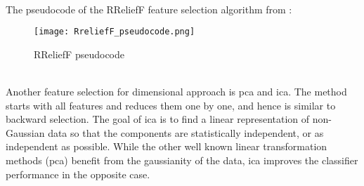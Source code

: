 \\
The pseudocode of the RReliefF feature selection algorithm from \cite{robnik2003theoretical}:
\begin{figure}[h]
    \centering
    \texttt{[image: RreliefF\_pseudocode.png]} 
	\caption{RReliefF pseudocode}
    \label{fig:RreliefF_pseudocode}
\end{figure}
\\ \indent
Another feature selection for dimensional approach is \gls{pca} and \gls{ica}. The method starts with all features and reduces them one by one, and hence is similar to backward selection. The goal of \gls{ica} is to find a linear representation of non-Gaussian data so that the components are statistically independent, or as independent as possible. While the other well known linear transformation methods (\gls{pca}) benefit from the gaussianity of the data, \gls{ica} improves the classifier performance in the opposite case.

\newpage
